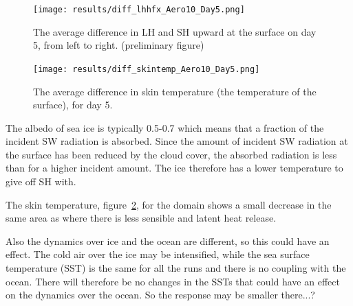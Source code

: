 \begin{figure}[h!]
\centering
\texttt{[image: results/diff\_lhhfx\_Aero10\_Day5.png]}
\caption{The average difference in LH and SH upward at the surface on day 5, from left to right. (preliminary figure)}
\label{fig:lhhfx_r3Day5}
\end{figure}

\begin{figure}[h!]
\centering
\texttt{[image: results/diff\_skintemp\_Aero10\_Day5.png]}
\caption{The average difference in skin temperature (the temperature of the surface), for day 5.}
\label{fig:skintemp_r3Day5}
\end{figure}
The albedo of sea ice is typically 0.5-0.7 which means that a fraction of the incident SW radiation is absorbed. Since the amount of incident SW radiation at the surface has been reduced by the cloud cover, the absorbed radiation is less than for a higher incident amount. The ice therefore has a lower temperature to give off SH with. 

The skin temperature, figure~\ref{fig:skintemp_r3Day5}, for the domain shows a small decrease in the same area as where there is less sensible and latent heat release.

Also the dynamics over ice and the ocean are different, so this could have an effect. The cold air over the ice may be intensified, while the sea surface temperature (SST) is the same for all the runs and there is no coupling with the ocean. There will therefore be no changes in the SSTs that could have an effect on the dynamics over the ocean. So the response may be smaller there...?





